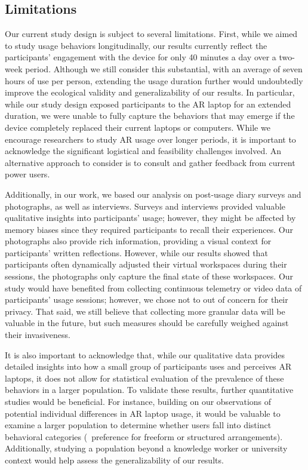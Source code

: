 \subsection{Limitations}
Our current study design is subject to several limitations.
First, while we aimed to study usage behaviors longitudinally, 
our results currently reflect the participants' engagement with the device for only 40 minutes a day over a two-week period.
Although we still consider this substantial, with an average of seven hours of use per person, extending the usage duration further would undoubtedly improve the ecological validity and generalizability of our results.
In particular, 
while our study design exposed participants to the AR laptop for an extended duration, 
we were unable to fully capture the behaviors that may emerge if the device completely replaced their current laptops or computers.
While we encourage researchers to study AR usage over longer periods, it is important to acknowledge the significant logistical and feasibility challenges involved. 
An alternative approach to consider is to consult and gather feedback from current power users.

Additionally, in our work, 
we based our analysis on post-usage diary surveys and photographs, as well as interviews.
Surveys and interviews provided valuable qualitative insights into participants' usage; however, they might be affected by memory biases since they required participants to recall their experiences.
Our photographs also provide rich information, providing a visual context for participants' written reflections.
However, while our results showed that participants often dynamically adjusted their virtual workspaces during their sessions, the photographs only capture the final state of these workspaces.
Our study would have benefited from collecting continuous telemetry or video data of participants' usage sessions; however, we chose not to out of concern for their privacy.
That said, we still believe that collecting more granular data will be valuable in the future, but such measures should be carefully weighed against their invasiveness.

It is also important to acknowledge that, while our qualitative data provides detailed insights into how a small group of participants uses and perceives AR laptops, it does not allow for statistical evaluation of the prevalence of these behaviors in a larger population. 
To validate these results, further quantitative studies would be beneficial. 
For instance, 
building on our observations of potential individual differences in AR laptop usage, it would be valuable to examine a larger population to determine whether users fall into distinct behavioral categories (\eg~preference for freeform or structured arrangements). 
Additionally, studying a population beyond a knowledge worker or university context would help assess the generalizability of our results.

